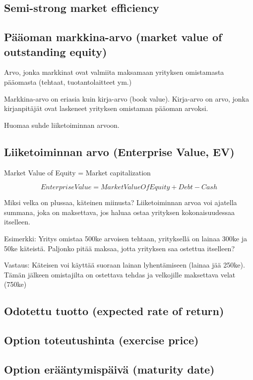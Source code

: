 \documentclass[a4paper]{article}
\begin{document}
\subsection{Semi-strong market efficiency}

\subsection{Pääoman markkina-arvo (market value of outstanding equity)}

Arvo, jonka markkinat ovat valmiita maksamaan yrityksen omistamasta pääomasta (tehtaat, tuotantolaitteet ym.)

Markkina-arvo on eriasia kuin kirja-arvo (book value). Kirja-arvo on arvo, jonka kirjanpitäjät ovat laskeneet yrityksen omistaman pääoman arvoksi.

Huomaa suhde liiketoiminnan arvoon.

\subsection{Liiketoiminnan arvo (Enterprise Value, EV)}

Market Value of Equity = Market capitalization

\[Enterprise Value = Market Value Of Equity + Debt - Cash\]

Miksi velka on plussaa, käteinen miinusta? Liiketoiminnan arvoa voi ajatella summana, joka on maksettava, jos haluaa ostaa yrityksen kokonaisuudessaa itselleen.

Esimerkki: Yritys omistaa 500ke arvoisen tehtaan, yrityksellä on lainaa 300ke ja 50ke käteistä. Paljonko pitää maksaa, jotta yrityksen saa ostettua itselleen?

Vastaus: Käteisen voi käyttää suoraan lainan lyhentämiseen (lainaa jää 250ke). Tämän jälkeen omistajilta on ostettava tehdas ja velkojille maksettava velat (750ke)

\subsection{Odotettu tuotto (expected rate of return)}

\subsection{Option toteutushinta (exercise price)}

\subsection{Option erääntymispäivä (maturity date)}
\end{document}
